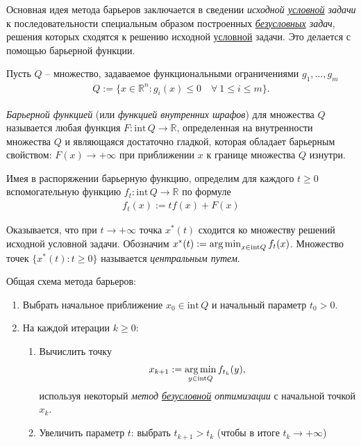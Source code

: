 \documentclass[%
	11pt,
	a4paper,
	utf8,
		]{article}
\begin{document}
Основная идея метода барьеров заключается в сведении \emph{исходной \underline{условной} задачи} к последовательности специальным образом построенных \emph{\underline{безусловных} задач}, решения которых сходятся к решению исходной \underline{условной} задачи. Это делается с помощью барьерной функции.

Пусть $ Q $ -- множество, задаваемое функциональными ограничениями $ g_1, \ldots, g_m $
\begin{align*}
	Q := \{ x \in \mathbb{R}^n: g_i (x) \leqslant 0 \quad \forall \ 1 \leqslant i \leqslant m \}.
\end{align*}

\emph{Барьерной функцией} (или \emph{функцией внутренних шрафов}) для множества $ Q $ называется любая функция $ F: \text{int} \, Q \rightarrow \mathbb{R} $, определенная на внутренности множества $ Q $ и являющаяся достаточно гладкой, которая обладает барьерным свойством: $ F(x) \rightarrow + \infty $ при приближении $ x $ к границе множества $ Q $ изнутри.

Имея в распоряжении барьерную функцию, определим для каждого $ t \geqslant 0 $ вспомогательную функцию $ f_t: \text{int} \, Q \rightarrow \mathbb{R} $ по формуле
\begin{align*}
	f_t(x) := t f(x) + F(x)
\end{align*}

Оказывается, что при $ t \rightarrow + \infty $ точка $ x^{*}(t) $ сходится ко множеству решений исходной условной задачи. Обозначим $ x^{*}(t) := \operatorname*{arg\,min}_{ x \in \text{int} Q } f_t(x) $. Множество точек $ \{ x^{*}(t): t \geqslant 0 \} $ называется \emph{центральным путем}.

{\color{blue}Общая схема метода барьеров}:
\begin{enumerate}
	\item Выбрать начальное приближение $ x_0 \in \text{int} \, Q $ и начальный параметр $ t_0 > 0 $.
	
	\item На каждой итерации $ k \geqslant 0 $:
	\begin{enumerate}
		\item Вычислить точку 
\begin{align*}
x_{k+1} := \operatorname*{arg\,min}_{ y \in \text{int} Q } f_{t_k} (y),
\end{align*}
    используя некоторый \emph{метод \underline{безусловной} оптимизации} с начальной точкой $ x_k $.
    
    \item Увеличить параметр $ t $: выбрать $ t_{k+1} > t_k $ (чтобы в итоге $ t_k \rightarrow + \infty $)
	\end{enumerate}
\end{enumerate}
\end{document}
